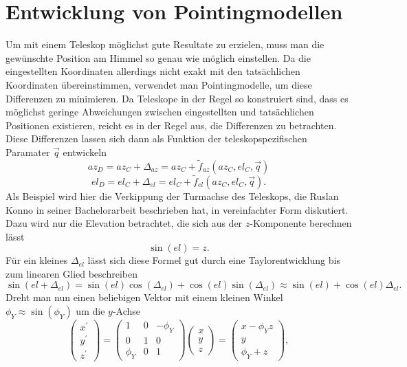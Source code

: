 \section{Entwicklung von Pointingmodellen}
Um mit einem Teleskop möglichst gute Resultate zu erzielen, muss man die gewünschte Position am Himmel so genau wie möglich einstellen. Da die eingestellten Koordinaten allerdings nicht exakt mit den tatsächlichen Koordinaten übereinstimmen, verwendet man Pointingmodelle, um diese Differenzen zu minimieren. Da Teleskope in der Regel so konstruiert sind, dass es möglichst geringe Abweichungen zwischen eingestellten und tatsächlichen Positionen existieren, reicht es in der Regel aus, die Differenzen zu betrachten. Diese Differenzen lassen sich dann als Funktion der teleskopspezifischen Paramater $\vec{q}$ entwickeln
\begin{equation}
az_D=az_C+\Delta_{az}=az_C+\tilde{f}_{az}\left(az_C,el_C,\vec{q}\right)
\label{eq:PointingZero-}
\end{equation}
\begin{equation}
el_D=el_C+\Delta_{el}=el_C+\tilde{f}_{el}\left(az_C,el_C,\vec{q}\right).
\label{eq:pointingZero}
\end{equation}
Als Beispiel wird hier die Verkippung der Turmachse des Teleskops, die Ruslan Konno in seiner Bachelorarbeit \cite{Ruslan} beschrieben hat, in vereinfachter Form diskutiert. Dazu wird nur die Elevation betrachtet, die sich aus der $z$-Komponente berechnen lässt
\begin{equation}
\sin(el)=z.
\label{eq:sinel}
\end{equation}
Für ein kleines $\Delta_{el}$ lässt sich diese Formel gut durch eine Taylorentwicklung bis zum linearen Glied beschreiben
\begin{equation}
\sin(el+\Delta_{el})=\sin(el)\cos(\Delta_{el})+\cos(el)\sin(\Delta_{el})\approx \sin(el)+\cos(el)\Delta_{el}.
\label{eq:approx}
\end{equation}
Dreht man nun einen beliebigen Vektor mit einem kleinen Winkel $\phi_Y \approx \sin(\phi_Y)$ um die $y$-Achse
\begin{equation}
\left(\begin{array}{c}
x^{\prime}\\y^{\prime}\\z^{\prime}
\end{array}\right)=\left(\begin{array}{ccc}
1 & 0 & -\phi_Y\\0 & 1 & 0 \\\phi_Y & 0 & 1
\end{array}\right)\left(\begin{array}{c}
x\\y\\z
\end{array}\right)=\left(\begin{array}{c}
x-\phi_Yz\\y\\\phi_Y+z
\end{array}\right),
\end{equation}
